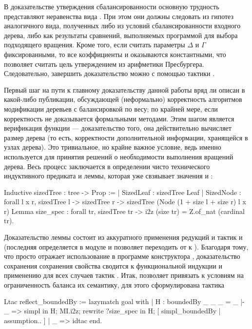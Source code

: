 \documentclass[a4paper,14pt]{extarticle}
\begin{document}
В доказательстве утверждения сбалансированности
основную трудность представляют неравенства вида
.
При этом они должны следовать из гипотез аналогичного вида, полученных
либо из условий сбалансированности входного дерева,
либо как результаты сравнений, выполняемых программой
для выбора подходящего вращения.
Кроме того, если считать параметры
\( \Delta \) и \( \Gamma \)
фиксированными, то все коэффициенты  и 
оказываются константными,
что позволяет считать цель утверждением из арифметики Пресбургера.
Следовательно, завершить доказательство можно
с помощью тактики .

Первый шаг на пути к главному доказательству данной работы
вряд ли описан в какой-либо публикации,
обсуждающей (неформально) корректность алгоритмов модификации
деревьев с балансировкой по весу;
по крайней мере, если корректность не доказывается
формальными методами.
Этим шагом является верификация функции  ---
доказательство того, она действительно вычисляет размер дерева
(то есть, корректности дополнительной информации, хранящейся в узлах дерева).
Это тривиальное, но крайне важное условие,
ведь именно  используется для принятия
решений о необходимости выполнения вращений дерева.
Весь процесс заключается в определении
чисто технического индуктивного предиката
и леммы, которая уже свзяывает значения
 и :
\begin{coqcode}
Inductive sizedTree : tree -> Prop :=
  | SizedLeaf : sizedTree Leaf
  | SizedNode : forall l x r,
                sizedTree l ->
                sizedTree r ->
                sizedTree (Node
                  (1 + size l + size r)
                  l x r)
Lemma size_spec : forall tr, sizedTree tr ->
  i2z (size tr) = Z.of_nat (cardinal tr).
\end{coqcode}

Доказательство леммы состоит из
аккуратного применения редукций
и тактик 
и 
(последняя определяется в модуле
и позволяет переходить от  к ).
Благодаря тому, что  просто
отражает использование в программе конструктора ,
доказательство сохранения сохранения свойства
 сводится к функциональной индукции
и применению для всех случаев тактик .
Итак,  позволяет
привязать к условиям на ограниченность баланса
их семантику, для этого сформулирована тактика
\begin{coqcode}
Ltac reflect_boundedBy := lazymatch goal with
  | H : boundedBy _ _ _ = _ |- _ =>
    simpl in H;
    MI.i2z;
    rewrite ?size_spec in H;
    [ simpl_boundedBy | assumption.. ]
  | _ => idtac
end.
\end{coqcode}
\end{document}
